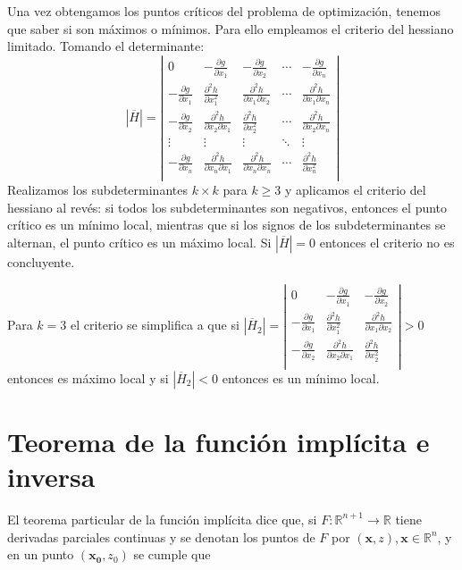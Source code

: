 \documentclass[a4paper]{article}
\begin{document}
Una vez obtengamos los puntos críticos del problema de optimización, tenemos que saber si son máximos o mínimos. Para ello empleamos el criterio del hessiano limitado. Tomando el determinante:
\[
|\overline{H}| = \left|\begin{matrix}
0 & -\frac{\partial g}{\partial x_1} & -\frac{\partial g}{\partial x_2} & \cdots & -\frac{\partial g}{\partial x_n} \\
-\frac{\partial g}{\partial x_1} & \frac{\partial^2 h}{\partial x_1^2} & \frac{\partial^2 h}{\partial x_1\partial x_2} & \cdots & \frac{\partial^2 h}{\partial x_1 \partial x_n}\\
-\frac{\partial g}{\partial x_2} & \frac{\partial^2 h}{\partial x_2\partial x_1} & \frac{\partial^2 h}{\partial x_2^2}  & \cdots & \frac{\partial^2 h}{\partial x_2 \partial x_n}\\
\vdots & \vdots & \vdots & \ddots & \vdots\\
-\frac{\partial g}{\partial x_n} & \frac{\partial^2 h}{\partial x_n\partial x_1} & \frac{\partial^2 h}{\partial x_n \partial x_n}  & \cdots & \frac{\partial^2 h}{\partial x_n^2}\\
\end{matrix} \right|
\]
Realizamos los subdeterminantes $k\times k$ para $k \ge 3 $ y aplicamos el criterio del hessiano al revés: si todos los subdeterminantes son negativos, entonces el punto crítico es un mínimo local, mientras que si los signos de los subdeterminantes se alternan, el punto crítico es un máximo local. Si $|\overline{H}| = 0$ entonces el criterio no es concluyente.

Para $k = 3 $ el criterio se simplifica a que si $|\overline{H}_2|  =
\left|\begin{matrix}
0 & -\frac{\partial g}{\partial x_1} & -\frac{\partial g}{\partial x_2}  \\
-\frac{\partial g}{\partial x_1} & \frac{\partial^2 h}{\partial x_1^2} & \frac{\partial^2 h}{\partial x_1\partial x_2} \\
-\frac{\partial g}{\partial x_2} & \frac{\partial^2 h}{\partial x_2\partial x_1} & \frac{\partial^2 h}{\partial x_2^2}\\
\end{matrix} \right|
> 0$ entonces es máximo local y si $|\overline{H}_2| < 0$ entonces es un mínimo local.

\section{Teorema de la función implícita e inversa}
El teorema particular de la función implícita dice que, si $F: \mathbb{R}^{n+1} \rightarrow \mathbb{R}$ tiene derivadas parciales continuas y se denotan los puntos de $F$ por $(\textbf{x}, z), \textbf{x} \in \mathbb{R}^n$, y en un punto $(\textbf{x}_\textbf{0}, z_0)$ se cumple que 
\end{document}
